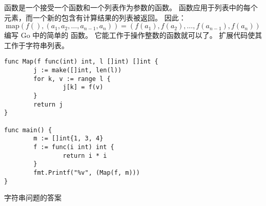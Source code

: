 \begin{Exercise}[title={Map function},difficulty=4]
\label{ex:map function}
 函数是一个接受一个函数和一个列表作为参数的函数。
函数应用于列表中的每个元素，而一个新的包含有计算结果的列表被返回。
因此：
$$ \mathrm{map}(f(), (a_1,a_2,\ldots,a_{n-1},a_n)) =  (f(a_1), f(a_2),\ldots,f(a_{n-1}), f(a_n)) $$
\Question \label{ex:map function q1} 编写 Go 中的简单的  函数。
它能工作于操作整数的函数就可以了。
\Question \label{ex:map function q2} 扩展代码使其工作于字符串列表。

\end{Exercise}

\begin{Answer}

\Question 
\begin{lstlisting}[caption=Map 函数]
func Map(f func(int) int, l []int) []int {
        j := make([]int, len(l))
        for k, v := range l {
                j[k] = f(v)
        }
        return j
}

func main() {
        m := []int{1, 3, 4}
        f := func(i int) int {
                return i * i
        }
        fmt.Printf("%v", (Map(f, m)))
}
\end{lstlisting}

\Question 字符串问题的答案
\end{Answer}


